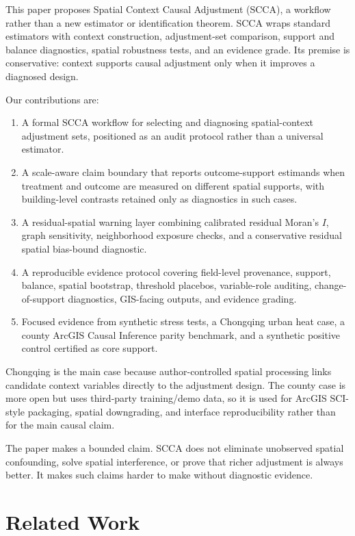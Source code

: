 \documentclass{article}
\begin{document}
This paper proposes Spatial Context Causal Adjustment (SCCA), a workflow rather than a new estimator or identification theorem. SCCA wraps standard estimators with context construction, adjustment-set comparison, support and balance diagnostics, spatial robustness tests, and an evidence grade. Its premise is conservative: context supports causal adjustment only when it improves a diagnosed design.

Our contributions are:

\begin{enumerate}
\item A formal SCCA workflow for selecting and diagnosing spatial-context adjustment sets, positioned as an audit protocol rather than a universal estimator.
\item A scale-aware claim boundary that reports outcome-support estimands when treatment and outcome are measured on different spatial supports, with building-level contrasts retained only as diagnostics in such cases.
\item A residual-spatial warning layer combining calibrated residual Moran's $I$, graph sensitivity, neighborhood exposure checks, and a conservative residual spatial bias-bound diagnostic.
\item A reproducible evidence protocol covering field-level provenance, support, balance, spatial bootstrap, threshold placebos, variable-role auditing, change-of-support diagnostics, GIS-facing outputs, and evidence grading.
\item Focused evidence from synthetic stress tests, a Chongqing urban heat case, a county ArcGIS Causal Inference parity benchmark, and a synthetic positive control certified as core support.
\end{enumerate}

Chongqing is the main case because author-controlled spatial processing links candidate context variables directly to the adjustment design. The county case is more open but uses third-party training/demo data, so it is used for ArcGIS SCI-style packaging, spatial downgrading, and interface reproducibility rather than for the main causal claim.

The paper makes a bounded claim. SCCA does not eliminate unobserved spatial confounding, solve spatial interference, or prove that richer adjustment is always better. It makes such claims harder to make without diagnostic evidence.


\section{Related Work}
\label{sec:related}
\end{document}
